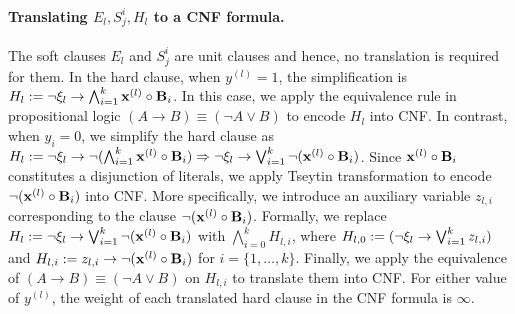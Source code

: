 \paragraph{Translating $ E_l, S^i_j, H_l $ to a CNF formula.} 
The soft clauses $ E_l $ and $ S_j^i $ are unit clauses and hence, no translation is required for them.  In the hard clause, when $ y^{(l)}=1 $, the simplification is $ H_l:= \neg \xi_l \rightarrow \bigwedge_{i=1}^k {\mathbf{x}^{(l)}} \circ {\ensuremath{\mathbf{B}}_{i}}  $. In this case, we apply the equivalence rule in propositional logic $ (A \rightarrow B) \equiv (\neg A \vee B) $  to encode $ H_l $ into  CNF. In contrast, when $ y_i=0 $, we simplify the hard clause as $ H_l:= \neg \xi_l \rightarrow \neg (\bigwedge_{i=1}^k {\mathbf{x}^{(l)}} \circ {\ensuremath{\mathbf{B}}_{i}}) \Rightarrow  \neg \xi_l \rightarrow \bigvee_{i=1}^k \neg({\mathbf{x}^{(l)}} \circ {\ensuremath{\mathbf{B}}_{i}})$. Since $ \mathbf{x}^{(l)} \circ \mathbf{B}_{i} $ constitutes a disjunction of literals, we apply Tseytin transformation to encode  $ \neg (\mathbf{x}^{(l)} \circ \mathbf{B}_{i}) $ into CNF. More specifically, we introduce an auxiliary variable $ z_{l,i} $ corresponding to the clause $ \neg ({\mathbf{x}^{(l)}} \circ {\ensuremath{\mathbf{B}}_{i}}) $. Formally, we replace $ H_l := \neg \xi_l \rightarrow  \bigvee_{i=1}^k \neg ({\mathbf{x}^{(l)}} \circ {\ensuremath{\mathbf{B}}_{i}}) $ with   $ \bigwedge_{i=0}^k H_{l,i} $,  where $ H_{l,0}:= (\neg \xi_l \rightarrow  \bigvee_{i=1}^k  z_{l,i}) $  and  $  H_{l,i}:= z_{l,i} \rightarrow  \neg({\mathbf{x}^{(l)}} \circ {\ensuremath{\mathbf{B}}_{i}})  $ for $ i=\{1,\dots,k\} $. Finally, we  apply the equivalence of $ (A \rightarrow B) \equiv (\neg A \vee B) $ on $ H_{l,i} $ to translate them into CNF. For either value of $ y^{(l)} $, the weight of each translated hard clause in the CNF formula is $ \infty $.








